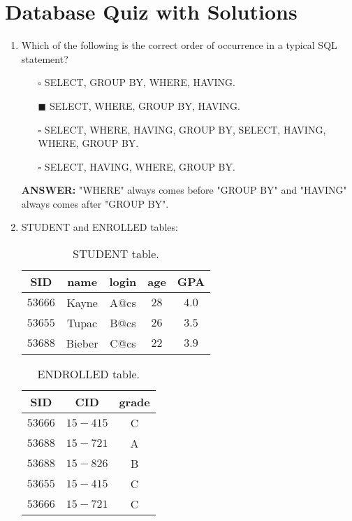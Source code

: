 \documentclass[10pt]{article}
\newcommand{\lightrule}{%
	\arrayrulecolor{black!30}%
	\midrule[\lightrulewidth]%
	\arrayrulecolor{black}}
\begin{document}
	\section{Database Quiz with Solutions}
	\begin{enumerate}
		\item Which of the following is the correct order of occurrence in a typical SQL statement?
			\begin{enumerate}
				\item[$\square$] SELECT, GROUP BY, WHERE, HAVING.
				\item[$\blacksquare$] SELECT, WHERE, GROUP BY, HAVING.
				\item[$\square$] SELECT, WHERE, HAVING, GROUP BY, SELECT, HAVING, WHERE, GROUP BY.
				\item[$\square$] SELECT, HAVING, WHERE, GROUP BY.
			\end{enumerate}
			\color{red} \textbf{ANSWER:} \color{black} "WHERE" always comes before "GROUP BY" and "HAVING" always comes after "GROUP BY".

		\item STUDENT and ENROLLED tables:
			\begin{table}[H]
				\centering
				\begin{tabular}{@{} *{5}{c} @{}}
					\toprule
						\textbf{SID} & \textbf{name} & \textbf{login} & \textbf{age} & \textbf{GPA} \\
					\midrule
						$53666$ & Kayne & A@cs & $28$ & $4.0$ \\ 
					\lightrule
						$53655$ & Tupac & B@cs & $26$ & $3.5$ \\  
					\lightrule
						$53688$ & Bieber & C@cs & $22$ & $3.9$ \\ 
					\bottomrule
				\end{tabular}
				\caption{STUDENT table.}
			\end{table}

			\begin{table}[H]
				\centering
				\begin{tabular}{@{} *{3}{c} @{}}
					\toprule
						\textbf{SID} & \textbf{CID} & \textbf{grade} \\
					\midrule
						$53666$ & $15-415$ & C \\ 
					\lightrule
						$53688$ & $15-721$ & A \\  
					\lightrule
						$53688$ & $15-826$ & B \\
					\lightrule 
						$53655$ & $15-415$ & C \\ 
					\lightrule 
						$53666$ & $15-721$ & C \\ 
					\bottomrule
				\end{tabular}
				\caption{ENDROLLED table.}
			\end{table}
		

\end{enumerate}
\end{document}
